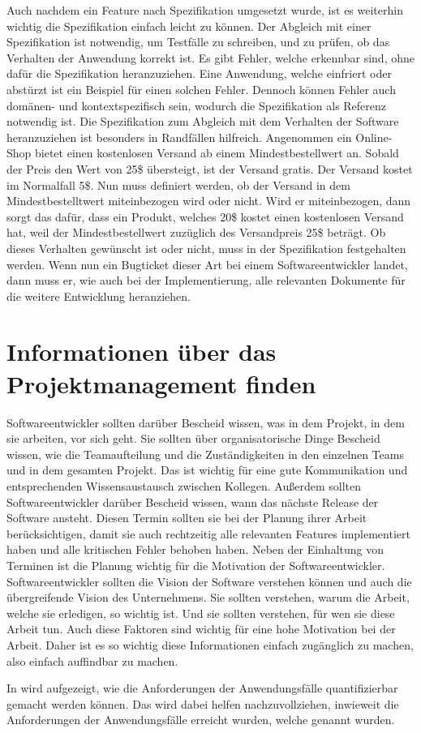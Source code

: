 Auch nachdem ein Feature nach Spezifikation umgesetzt wurde, ist es weiterhin wichtig die Spezifikation einfach leicht zu können.
Der Abgleich mit einer Spezifikation ist notwendig, um Testfälle zu schreiben, und zu prüfen, ob das Verhalten der Anwendung korrekt ist.
Es gibt Fehler, welche erkennbar sind, ohne dafür die Spezifikation heranzuziehen.
Eine Anwendung, welche einfriert oder abstürzt ist ein Beispiel für einen solchen Fehler.
Dennoch können Fehler auch domänen- und kontextspezifisch sein, wodurch die Spezifikation als Referenz notwendig ist.
Die Spezifikation zum Abgleich mit dem Verhalten der Software heranzuziehen ist besonders in Randfällen hilfreich.
Angenommen ein Online-Shop bietet einen kostenlosen Versand ab einem Mindestbestellwert an.
Sobald der Preis den Wert von 25\$ übersteigt, ist der Versand gratis.
Der Versand kostet im Normalfall 5\$.
Nun muss definiert werden, ob der Versand in dem Mindestbestelltwert miteinbezogen wird oder nicht.
Wird er miteinbezogen, dann sorgt das dafür, dass ein Produkt, welches 20\$ kostet einen kostenlosen Versand hat, weil der Mindestbestellwert zuzüglich des Versandpreis 25\$ beträgt.
Ob dieses Verhalten gewünscht ist oder nicht, muss in der Spezifikation festgehalten werden.
Wenn nun ein Bugticket dieser Art bei einem Softwareentwickler landet, dann muss er, wie auch bei der Implementierung, alle relevanten Dokumente für die weitere Entwicklung heranziehen.\\

\section{Informationen über das Projektmanagement finden}
Softwareentwickler sollten darüber Bescheid wissen, was in dem Projekt, in dem sie arbeiten, vor sich geht.
Sie sollten über organisatorische Dinge Bescheid wissen, wie die Teamaufteilung und die Zuständigkeiten in den einzelnen Teams und in dem gesamten Projekt.
Das ist wichtig für eine gute Kommunikation und entsprechenden Wissensaustausch zwischen Kollegen.
Außerdem sollten Softwareentwickler darüber Bescheid wissen, wann das nächste Release der Software ansteht.
Diesen Termin sollten sie bei der Planung ihrer Arbeit berücksichtigen, damit sie auch rechtzeitig alle relevanten Features implementiert haben und alle kritischen Fehler behoben haben.
Neben der Einhaltung von Terminen ist die Planung wichtig für die Motivation der Softwareentwickler.
Softwareentwickler sollten die Vision der Software verstehen können und auch die übergreifende Vision des Unternehmens.
Sie sollten verstehen, warum die Arbeit, welche sie erledigen, so wichtig ist.
Und sie sollten verstehen, für wen sie diese Arbeit tun.
Auch diese Faktoren sind wichtig für eine hohe Motivation bei der Arbeit.
Daher ist es so wichtig diese Informationen einfach zugänglich zu machen, also einfach auffindbar zu machen.

In  wird aufgezeigt, wie die Anforderungen der Anwendungsfälle quantifizierbar gemacht werden können.
Das wird dabei helfen nachzuvollziehen, inwieweit die Anforderungen der Anwendungsfälle erreicht wurden, welche genannt wurden.
